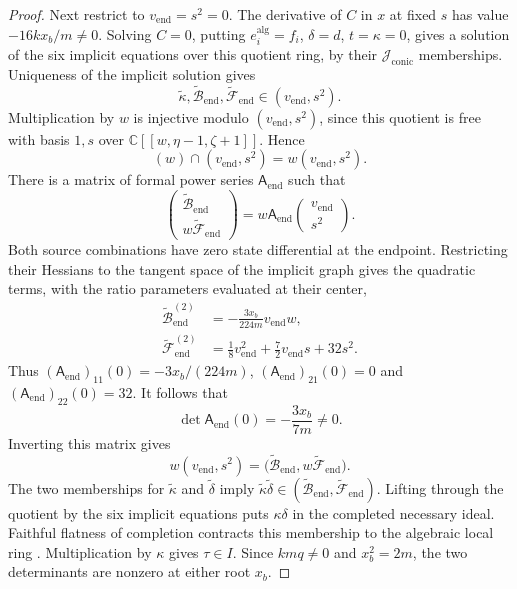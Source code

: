 \documentclass[11pt,a4paper]{article}
\numberwithin{equation}{section}
\theoremstyle{plain}
\theoremstyle{definition}
\theoremstyle{remark}
\begin{document}
\begin{proof}
Next restrict to $v_{\mathrm{end}}=s^2=0$.
The derivative of $C$ in $x$ at fixed $s$ has value
$-16kx_b/m\ne0$. Solving $C=0$, putting
$e_i^{\mathrm{alg}}=f_i$, $\delta=d$, $t=\kappa=0$,
gives a solution of the six implicit equations over this
quotient ring, by their $\mathcal J_{\mathrm{conic}}$
memberships. Uniqueness of the implicit solution gives
\[
 \widetilde\kappa,
 \widetilde{\mathcal B}_{\mathrm{end}},
 \widetilde{\mathcal F}_{\mathrm{end}}
       \in(v_{\mathrm{end}},s^2).
\]
Multiplication by $w$ is injective modulo
$(v_{\mathrm{end}},s^2)$, since this quotient is free with
basis $1,s$ over $\mathbb C[[w,\eta-1,\zeta+1]]$.
Hence
\[
 (w)\cap(v_{\mathrm{end}},s^2)
       =w(v_{\mathrm{end}},s^2).
\]
There is a matrix of formal power series
$\mathsf A_{\mathrm{end}}$ such that
\[
 \begin{pmatrix}
   \widetilde{\mathcal B}_{\mathrm{end}}\\
   w\widetilde{\mathcal F}_{\mathrm{end}}
 \end{pmatrix}
   =w\mathsf A_{\mathrm{end}}
       \begin{pmatrix}v_{\mathrm{end}}\\s^2\end{pmatrix}.
\]
Both source combinations have zero state differential at
the endpoint. Restricting their Hessians to the tangent space
of the implicit graph gives the quadratic terms, with the
ratio parameters evaluated at their center,
\[
 \begin{aligned}
  \widetilde{\mathcal B}_{\mathrm{end}}^{(2)}
     &=-\frac{3x_b}{224m}v_{\mathrm{end}}w,\\
  \widetilde{\mathcal F}_{\mathrm{end}}^{(2)}
     &=\frac18v_{\mathrm{end}}^2
         +\frac72v_{\mathrm{end}}s+32s^2.
 \end{aligned}
\]
Thus $(\mathsf A_{\mathrm{end}})_{11}(0)=-3x_b/(224m)$,
$(\mathsf A_{\mathrm{end}})_{21}(0)=0$ and
$(\mathsf A_{\mathrm{end}})_{22}(0)=32$. It follows that
\[
 \det\mathsf A_{\mathrm{end}}(0)
       =-\frac{3x_b}{7m}\ne0.
\]
Inverting this matrix gives
\[
 w(v_{\mathrm{end}},s^2)
   =\bigl(\widetilde{\mathcal B}_{\mathrm{end}},
             w\widetilde{\mathcal F}_{\mathrm{end}}\bigr).
\]
The two memberships for $\widetilde\kappa$ and
$\widetilde\delta$ imply
$\widetilde\kappa\widetilde\delta\in
 (\widetilde{\mathcal B}_{\mathrm{end}},
  \widetilde{\mathcal F}_{\mathrm{end}})$.
Lifting through the quotient by the six implicit equations
puts $\kappa\delta$ in the completed necessary ideal.
Faithful flatness of completion contracts this membership
to the algebraic local ring
\cite[Lemma~10.97.3, Tag~00MC]{StacksProject}.
Multiplication by $\kappa$ gives $\tau\in I$.
Since $kmq\ne0$ and $x_b^2=2m$, the two determinants
are nonzero at either root $x_b$.
\end{proof}
\end{document}
